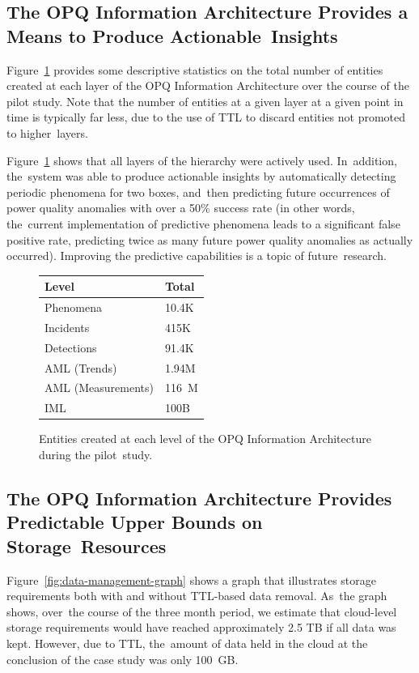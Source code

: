 \documentclass[energies,article,accept,moreauthors,pdftex]{Definitions/mdpi}
\begin{document}
\subsection{The OPQ Information Architecture Provides a Means to Produce Actionable~Insights}
\label{hyp:04}

Figure~\ref{fig:level-statistics} provides some descriptive statistics on the total number of entities created at each layer of the OPQ Information Architecture over the course of the pilot study. Note that the number of entities at a given layer at a given point in time is typically far less, due to the use of TTL to discard entities not promoted to higher~layers.


Figure~\ref{fig:level-statistics} shows that all layers of the hierarchy were actively used. In~addition, the~system was able to produce actionable insights by automatically detecting periodic phenomena for two boxes, and~then predicting future occurrences of power quality anomalies with over a 50\% success rate (in other words, the~current implementation of predictive phenomena leads to a significant false positive rate, predicting twice as many future power quality anomalies as actually occurred). Improving the predictive capabilities is a topic of future~research.


\begin{figure}[H]
\centering
\begin{tabularx}{.4\textwidth}{lX}
\toprule
\textbf{Level} & \textbf{Total} \\
\midrule
Phenomena & 10.4K \\
Incidents & 415K \\
Detections & 91.4K \\
AML (Trends) & 1.94M \\
AML (Measurements) & 116~M \\
IML & 100B \\
\bottomrule
\end{tabularx}
\caption{Entities created at each level of the OPQ Information Architecture during the pilot~study.}
\label{fig:level-statistics}
\end{figure}

\subsection{The OPQ Information Architecture Provides Predictable Upper Bounds on Storage~Resources}
\label{hyp:05}

Figure~\ref{fig:data-management-graph} shows a graph that illustrates storage requirements both with and without TTL-based data removal. As~the graph shows, over~the course of the three month period, we estimate that cloud-level storage requirements would have reached approximately 2.5 TB if all data was kept. However, due to TTL, the~amount of data held in the cloud at the conclusion of the case study was only 100~GB.
\end{document}
